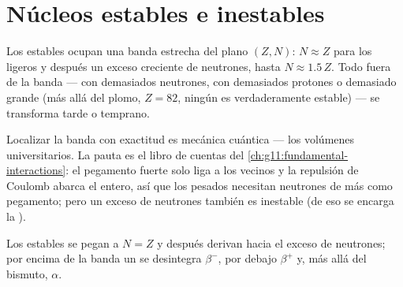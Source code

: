 \section{Núcleos estables e inestables}

\begin{proposition}\label{prop:g11:nucleus-radioactivity:valley}
Los  estables ocupan una banda estrecha del plano $(Z, N)$:
$N \approx Z$ para los  ligeros y después un exceso creciente de
neutrones, hasta $N \approx 1.5\,Z$. Todo  fuera de la banda ---
con demasiados neutrones, con demasiados protones o demasiado grande
(más allá del plomo, $Z = 82$, ningún  es verdaderamente
estable) --- se transforma tarde o temprano.
\end{proposition}
\admitted

\begin{remark}
Localizar la banda con exactitud es mecánica cuántica --- los volúmenes
universitarios. La pauta es el libro de cuentas del
\cref{ch:g11:fundamental-interactions}: el pegamento fuerte solo liga a
los vecinos y la repulsión de Coulomb abarca el  entero, así que
los  pesados necesitan neutrones de más como pegamento; pero un
exceso de neutrones también es inestable (de eso se encarga la
).
\end{remark}

\begin{omfigure}

{\small Los  estables se pegan a $N = Z$ y después derivan
hacia el exceso de neutrones; por encima de la banda un  se
desintegra $\beta^-$, por debajo $\beta^+$ y, más allá del bismuto,
$\alpha$.}
\end{omfigure}

